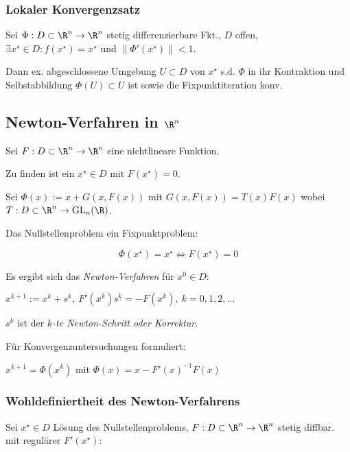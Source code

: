 \subsubsection*{Lokaler Konvergenzsatz}

Sei $\Phi : D \subset \R^n \to \R^n$ stetig differenzierbare Fkt., $D$ offen, $\exists x^\star \in D : f(x^\star)=x^\star$ und $\|\Phi'(x^\star)\| < 1$.

\vspace*{1mm}

Dann ex. abgeschlossene Umgebung $U \subset D$ von $x^\star$ s.d. $\Phi$ in ihr Kontraktion und Selbstabbildung $\Phi(U) \subset U$ ist sowie die Fixpunktiteration konv.

\subsection*{Newton-Verfahren in $\R^n$}

Sei $F : D \subset \R^n \to \R^n$ eine nichtlineare Funktion.

Zu finden ist ein $x^\star \in D$ mit $F(x^\star) = 0$.

\spacing

Sei $\Phi(x) := x + G(x,F(x))$ mit $G(x,F(x)) = T(x)F(x)$ wobei $T : D \subset \R^n \to \text{GL}_n(\R)$.

Das Nullstellenproblem ein Fixpunktproblem:

\vspace*{-2mm}
$$\Phi(x^\star) = x^\star \iff F(x^\star) = 0$$

Es ergibt sich das \emph{Newton-Verfahren} für $x^0 \in D$:

$x^{k+1} := x^k + s^k, \ F'(x^k)s^k = -F(x^k), \ k = 0,1,2,\dots$

\vspace*{1mm}

$s^k$ ist der \emph{$k$-te Newton-Schritt oder Korrektur}.

\spacing

Für Konvergenzuntersuchungen formuliert:

$x^{k+1} = \Phi(x^k)$ mit $\Phi(x) = x - F'(x)^{-1}F(x)$

\subsubsection*{Wohldefiniertheit des Newton-Verfahrens}

Sei $x^\star \in D$ Lösung des Nullstellenproblems, $F : D \subset \R^n \to \R^n$ stetig diffbar. mit regulärer $F'(x^\star)$:

